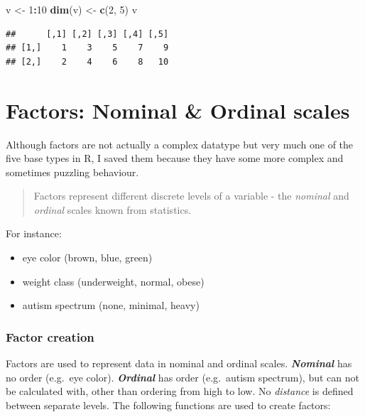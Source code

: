 \documentclass[]{book}
\newenvironment{Shaded}{\begin{snugshade}}{\end{snugshade}}
\newcommand{\DecValTok}[1]{\textcolor[rgb]{0.00,0.00,0.81}{#1}}
\newcommand{\KeywordTok}[1]{\textcolor[rgb]{0.13,0.29,0.53}{\textbf{#1}}}
\newcommand{\NormalTok}[1]{#1}
\newcommand{\OperatorTok}[1]{\textcolor[rgb]{0.81,0.36,0.00}{\textbf{#1}}}
\newcommand{\StringTok}[1]{\textcolor[rgb]{0.31,0.60,0.02}{#1}}
\providecommand{\tightlist}{%
  \setlength{\itemsep}{0pt}\setlength{\parskip}{0pt}}
\begin{document}
\begin{Shaded}
\begin{Highlighting}[]
\NormalTok{v <-}\StringTok{ }\DecValTok{1}\OperatorTok{:}\DecValTok{10}
\KeywordTok{dim}\NormalTok{(v) <-}\StringTok{ }\KeywordTok{c}\NormalTok{(}\DecValTok{2}\NormalTok{, }\DecValTok{5}\NormalTok{)}
\NormalTok{v}
\end{Highlighting}
\end{Shaded}

\begin{verbatim}
##      [,1] [,2] [,3] [,4] [,5]
## [1,]    1    3    5    7    9
## [2,]    2    4    6    8   10
\end{verbatim}

\hypertarget{factors-nominal-ordinal-scales}{%
\section{Factors: Nominal \& Ordinal scales}\label{factors-nominal-ordinal-scales}}

Although factors are not actually a complex datatype but very much one of the five base types in R, I saved them because they have some more complex and sometimes puzzling behaviour.

\begin{quote}
Factors represent different discrete levels of a variable - the \emph{nominal} and \emph{ordinal} scales known from statistics.
\end{quote}

For instance:

\begin{itemize}
\tightlist
\item
  eye color (brown, blue, green)
\item
  weight class (underweight, normal, obese)
\item
  autism spectrum (none, minimal, heavy)
\end{itemize}

\hypertarget{factor-creation}{%
\subsubsection*{Factor creation}\label{factor-creation}}

Factors are used to represent data in nominal and ordinal scales. \textbf{\emph{Nominal}} has no order (e.g.~eye color). \textbf{\emph{Ordinal}} has order (e.g.~autism spectrum), but can not be calculated with, other than ordering from high to low. No \emph{distance} is defined between separate levels. The following functions are used to create factors:
\end{document}
